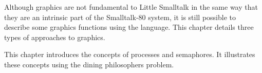
\secup

\secdown

Although graphics are not fundamental to Little Smalltalk in the same
way that they are an intrinsic part of the Smalltalk-80 system, it is still
possible to describe some graphics functions using the language. This
chapter details three types of approaches to graphics.


\secup

\secdown

This chapter introduces the concepts of processes and semaphores. It
illustrates these concepts using the dining philosophers problem.


\secup

\secup
